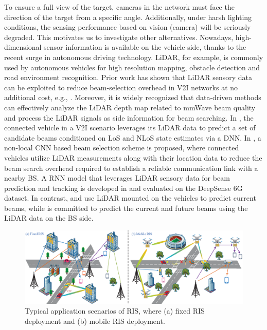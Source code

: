 \documentclass[journal,comsoc]{IEEEtran}
\begin{document}
To ensure a full view of the target, cameras in the network must face the direction of the target from a specific angle. Additionally, under harsh lighting conditions, the sensing performance based on vision (camera) will be seriously degraded. This motivates us to investigate other alternatives. Nowadays, high-dimensional sensor information is available on the vehicle side, thanks to the recent surge in autonomous driving technology. LiDAR, for example, is commonly used by autonomous vehicles for high resolution mapping, obstacle detection and road environment recognition. Prior work has shown that LiDAR sensory data can be exploited to reduce beam-selection overhead in V2I networks at no additional cost, e.g.,  \cite{Federated-mmWave-Beam-Selection-LIDAR-2021,Backdoor-Federated-Learning-2022,A-Privacy-Preserved-Split-Learning-2022,LIDAR-Data-DL-2019,LIDAR-Position-Aided-mmWave-Beam-Selection-2022,A-Personalized-Solution-2023,LiDAR-Future-Beam-Prediction-2023}. Moreover, it is widely recognized that data-driven methods can effectively analyze the LiDAR depth map related to mmWave beam quality and process the LiDAR signals as side information for beam searching. In \cite{LIDAR-Data-DL-2019}, the connected vehicle in a V2I scenario leverages its LiDAR data to predict a set of candidate beams conditioned on LoS and NLoS state estimates via a DNN. In \cite{LIDAR-Position-Aided-mmWave-Beam-Selection-2022}, a non-local CNN based beam selection scheme is proposed, where connected vehicles utilize LiDAR measurements along with their location data to reduce the beam search overhead required to establish a reliable communication link with a nearby BS. A RNN model that leverages LiDAR sensory data for beam prediction and tracking is developed in \cite{LiDAR-Future-Beam-Prediction-2023} and evaluated on the DeepSense 6G dataset. In contrast, \cite{LIDAR-Data-DL-2019} and \cite{LIDAR-Position-Aided-mmWave-Beam-Selection-2022} use LiDAR mounted on the vehicles to predict current beams, while \cite{LiDAR-Future-Beam-Prediction-2023} is committed to predict the current and future beams using the LiDAR data on the BS side.

\begin{figure}[t]
	\centering
	\includegraphics[width=17cm]{Use-Case-RIS.eps}
	\caption{Typical application scenarios of RIS, where (a) fixed RIS deployment and (b) mobile RIS deployment.}
	\label{fig:Use-Case-RIS}
\end{figure}
\end{document}
